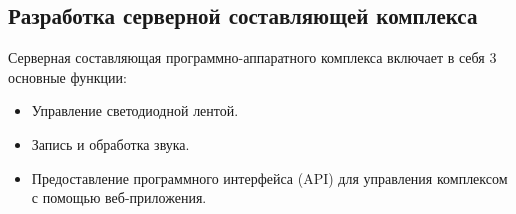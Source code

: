 \subsection{Разработка серверной составляющей комплекса}

Серверная составляющая программно-аппаратного комплекса включает в себя 3 основные функции:

\begin{itemize}
  \item Управление светодиодной лентой.
  \item Запись и обработка звука.
  \item Предоставление программного интерфейса (API) для управления комплексом с помощью веб-приложения.
\end{itemize}


















